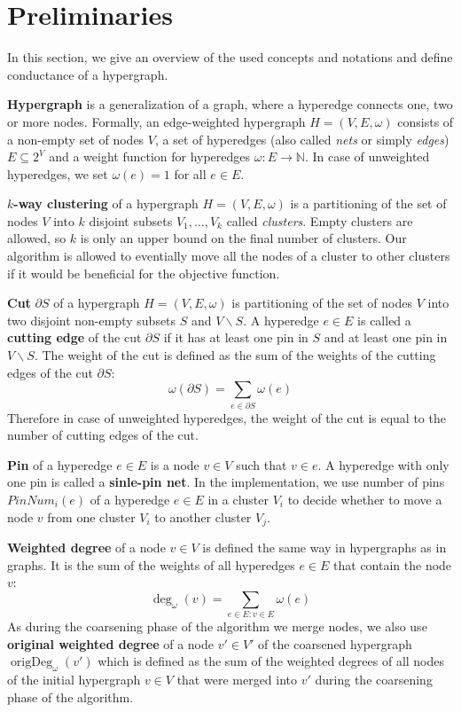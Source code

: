 \documentclass[acmsmall,nonacm,screen,review]{acmart}
\DeclareMathOperator{\origDeg}{origDeg}
\begin{document}
\section{Preliminaries}
\label{sec:preliminaries}

In this section, we give an overview of the used concepts and notations and 
define conductance of a hypergraph.

\smallbreak
\noindent\textbf{Hypergraph} is a generalization of a graph, where a hyperedge connects 
one, two or more nodes. Formally, an edge-weighted hypergraph $H = (V, E, \omega)$ 
consists of a non-empty set of nodes $V$, a set of hyperedges (also called 
\textit{nets} or simply \textit{edges}) $E \subseteq 2^V$ and a weight function
for hyperedges $\omega: E \to \mathbb{N}$. In case of unweighted hyperedges, 
we set $\omega(e) = 1$ for all $e \in E$. 

\smallbreak
\noindent\textbf{$k$-way clustering} of a hypergraph $H = (V, E,\omega)$ is a
partitioning of the set of nodes $V$ into $k$ disjoint subsets 
$V_1, \dots, V_k$ called \textit{clusters}. Empty clusters are allowed, so
$k$ is only an upper bound on the final number of clusters. Our algorithm is 
allowed to eventially move all the nodes of a cluster to other clusters if it 
would be beneficial for the objective function. 

\smallbreak
\noindent\textbf{Cut} $\partial S$ of a hypergraph $H = (V, E, \omega)$ is partitioning
of the set of nodes $V$ into two disjoint non-empty subsets $S$ and 
$V \backslash S$. A hyperedge $e \in E$ is called a \textbf{cutting edge} of 
the cut $\partial S$ if it has at least one pin in $S$ and at least one pin in
$V \backslash S$. The weight of the cut is defined as the sum of the weights of
the cutting edges of the cut $\partial S$: 
\[\omega(\partial S) = \sum_{e \in \partial S} \omega(e)\]
Therefore in case of unweighted hyperedges, the weight of the cut is equal to 
the number of cutting edges of the cut.

\smallbreak
\noindent\textbf{Pin} of a hyperedge $e \in E$ is a node $v \in V$ such that $v \in e$.
A hyperedge with only one pin is called a \textbf{sinle-pin net}.
In the implementation, we use number of pins $PinNum_i(e)$ of a hyperedge 
$e \in E$ in a cluster $V_i$ to decide whether to move a node $v$ from one
cluster $V_i$ to another cluster $V_j$.

\smallbreak
\noindent\textbf{Weighted degree} of a node $v \in V$ is defined the same way in 
hypergraphs as in graphs. It is the sum of the weights of all hyperedges 
$e \in E$ that contain the node $v$: 
\[\deg_\omega(v) = \sum_{e\in E: v \in E} \omega(e)\]
As during the coarsening phase of the algorithm we merge nodes, we also use
\textbf{original weighted degree} of a node $v' \in V'$ of the coarsened hypergraph
$\origDeg_\omega(v')$ 
which is defined as the sum of the weighted degrees of all nodes of the
initial hypergraph $v \in V$ that were merged into $v'$ during the coarsening 
phase of the algorithm.
\end{document}
